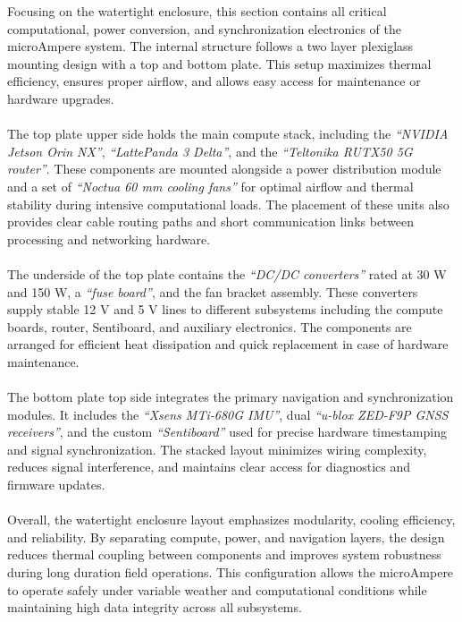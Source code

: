 \noindent
Focusing on the watertight enclosure, this section contains all critical computational, power conversion, and synchronization electronics of the microAmpere system. The internal structure follows a two layer plexiglass mounting design with a top and bottom plate. This setup maximizes thermal efficiency, ensures proper airflow, and allows easy access for maintenance or hardware upgrades.
\\ \\
The top plate upper side holds the main compute stack, including the \textit{``NVIDIA Jetson Orin NX''}, \textit{``LattePanda 3 Delta''}, and the \textit{``Teltonika RUTX50 5G router''}. These components are mounted alongside a power distribution module and a set of \textit{``Noctua 60 mm cooling fans''} for optimal airflow and thermal stability during intensive computational loads. The placement of these units also provides clear cable routing paths and short communication links between processing and networking hardware.
\\ \\
The underside of the top plate contains the \textit{``DC/DC converters''} rated at 30 W and 150 W, a \textit{``fuse board''}, and the fan bracket assembly. These converters supply stable 12 V and 5 V lines to different subsystems including the compute boards, router, Sentiboard, and auxiliary electronics. The components are arranged for efficient heat dissipation and quick replacement in case of hardware maintenance.
\\ \\
The bottom plate top side integrates the primary navigation and synchronization modules. It includes the \textit{``Xsens MTi-680G IMU''}, dual \textit{``u-blox ZED-F9P GNSS receivers''}, and the custom \textit{``Sentiboard''} used for precise hardware timestamping and signal synchronization. The stacked layout minimizes wiring complexity, reduces signal interference, and maintains clear access for diagnostics and firmware updates.
\\ \\
Overall, the watertight enclosure layout emphasizes modularity, cooling efficiency, and reliability. By separating compute, power, and navigation layers, the design reduces thermal coupling between components and improves system robustness during long duration field operations. This configuration allows the microAmpere to operate safely under variable weather and computational conditions while maintaining high data integrity across all subsystems.
